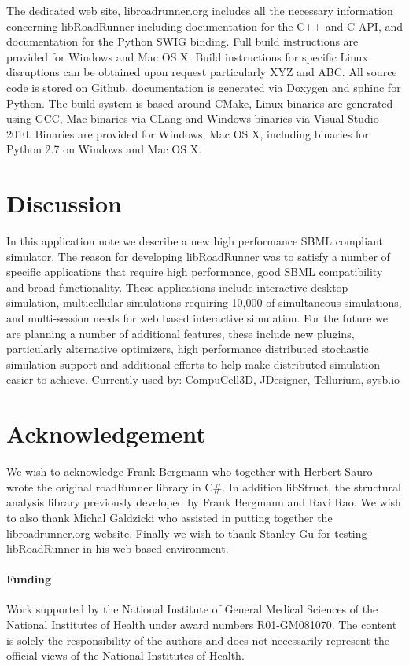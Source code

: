\documentclass{bioinfo}
\begin{document}
\begin{methods}
The dedicated web site, libroadrunner.org includes all the necessary information concerning libRoadRunner including documentation for the C++ and C API, and documentation for the Python SWIG binding. Full build instructions are provided for Windows and Mac OS X. Build instructions for specific Linux disruptions can be obtained upon request particularly XYZ and ABC. All source code is stored on Github, documentation is generated via Doxygen and sphinc for Python. The build system is based around CMake, Linux binaries are generated using GCC, Mac binaries via CLang \citealp{Boffelli03} and Windows binaries via Visual Studio 2010. Binaries are provided for Windows, Mac OS X, including binaries for Python 2.7 on Windows and Mac OS X.

\end{methods}

\section{Discussion}

In this application note we describe a new high performance SBML compliant simulator. The reason for developing libRoadRunner was to satisfy a number of specific applications that require high performance, good SBML compatibility and broad functionality. These applications include interactive desktop simulation, multicellular simulations requiring 10,000 of simultaneous simulations, and multi-session needs for web based interactive simulation.  For the future we are planning a number of additional features, these include new plugins, particularly alternative optimizers, high performance distributed stochastic simulation support and additional efforts to help make distributed simulation easier to achieve. Currently used by: CompuCell3D, JDesigner, Tellurium, sysb.io

\section*{Acknowledgement}
We wish to acknowledge Frank Bergmann who together with Herbert Sauro wrote the original roadRunner library in C\#. In addition libStruct, the structural analysis library previously developed by Frank Bergmann and Ravi Rao. We wish to also thank Michal Galdzicki who assisted in putting together the libroadrunner.org website. Finally we wish to thank Stanley Gu for testing libRoadRunner in his web based environment.

\paragraph{Funding\textcolon} Work supported by the National Institute of General Medical Sciences of the National Institutes of Health under award numbers R01-GM081070. The content is solely the responsibility of the authors and does not necessarily represent the official views of the National Institutes of Health.
\end{document}
